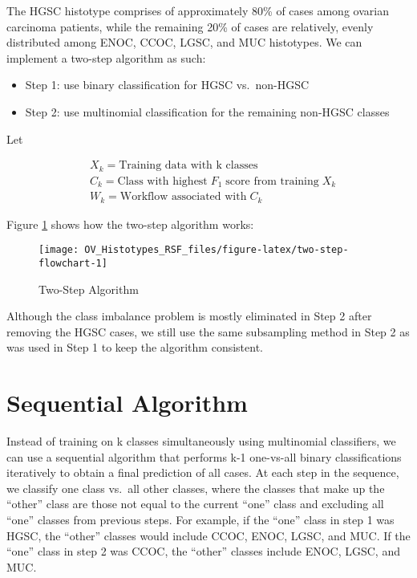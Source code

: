 \documentclass[
]{report}
\providecommand{\tightlist}{%
  \setlength{\itemsep}{0pt}\setlength{\parskip}{0pt}}
\begin{document}
The HGSC histotype comprises of approximately 80\% of cases among ovarian carcinoma patients, while the remaining 20\% of cases are relatively, evenly distributed among ENOC, CCOC, LGSC, and MUC histotypes. We can implement a two-step algorithm as such:

\begin{itemize}
\tightlist
\item
  Step 1: use binary classification for HGSC vs.~non-HGSC
\item
  Step 2: use multinomial classification for the remaining non-HGSC classes
\end{itemize}

Let

\[
\begin{aligned}
& X_k = \text{Training data with k classes}  \\
& C_k = \text{Class with highest}\;F_1\;\text{score from training}\;X_k \\
& W_k = \text{Workflow associated with}\;C_k
\end{aligned}
\label{eq:sequential}
\]

Figure \ref{fig:two-step-flowchart} shows how the two-step algorithm works:

\begin{figure}[H]

{\centering \texttt{[image: OV\_Histotypes\_RSF\_files/figure-latex/two-step-flowchart-1]} 

}

\caption{Two-Step Algorithm}\label{fig:two-step-flowchart}
\end{figure}

Although the class imbalance problem is mostly eliminated in Step 2 after removing the HGSC cases, we still use the same subsampling method in Step 2 as was used in Step 1 to keep the algorithm consistent.

\hypertarget{sequential-algorithm}{%
\section{Sequential Algorithm}\label{sequential-algorithm}}

Instead of training on k classes simultaneously using multinomial classifiers, we can use a sequential algorithm that performs k-1 one-vs-all binary classifications iteratively to obtain a final prediction of all cases. At each step in the sequence, we classify one class vs.~all other classes, where the classes that make up the ``other'' class are those not equal to the current ``one'' class and excluding all ``one'' classes from previous steps. For example, if the ``one'' class in step 1 was HGSC, the ``other'' classes would include CCOC, ENOC, LGSC, and MUC. If the ``one'' class in step 2 was CCOC, the ``other'' classes include ENOC, LGSC, and MUC.
\end{document}
